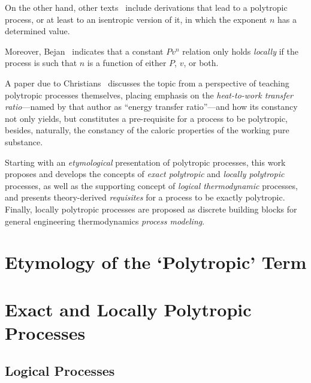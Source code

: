 \documentclass[fleqn,11pt]{SelfArx}
\begin{document}
    On  the  other  hand,  other  texts~\cite{1986-JonesJB+HawkinsGA-Wiley,   2006-BejanA-Wiley,
    2015-KroosKA+PotterMC-Cengage} include derivations that lead to a polytropic process, or  at
    least to an isentropic version of it, in which the exponent $n$ has a determined value.

    Moreover, Bejan~\cite[p.~175]{2006-BejanA-Wiley} indicates that a constant  $Pv^n$  relation
    only holds \emph{locally} if the process is such that $n$ is a function of either $P$,  $v$,
    or both.

    A paper due to Christians~\cite{2012-ChristiansJ-IntJMechEngEduc} discusses the topic from a
    perspective  of  teaching  polytropic  processes  themselves,  placing   emphasis   on   the
    \emph{heat-to-work transfer ratio}---named by that author as ``energy transfer ratio''---and
    how its constancy not only yields, but constitutes a  pre-requisite  for  a  process  to  be
    polytropic, besides, naturally, the constancy of the caloric properties of the working  pure
    substance.

    Starting with  an  \emph{etymological}  presentation  of  polytropic  processes,  this  work
    proposes and develops the concepts of \emph{exact polytropic} and \emph{locally  polytropic}
    processes, as well as the supporting concept of \emph{logical thermodynamic} processes,  and
    presents theory-derived \emph{requisites} for a process to be exactly  polytropic.  Finally,
    locally  polytropic  processes  are  proposed  as  discrete  building  blocks  for   general
    engineering thermodynamics \emph{process modeling}.

\section{Etymology of the `Polytropic' Term}


\section{Exact and Locally Polytropic Processes}

    \subsection{Logical Processes}
\end{document}
